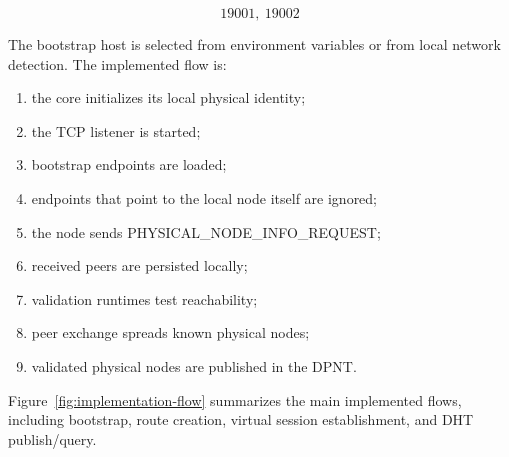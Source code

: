 \documentclass[12pt,a4paper]{article}
\newcommand{\codebreak}[1]{{\footnotesize\ttfamily #1}}
\begin{document}
\begin{equation}
    19001,\ 19002
\end{equation}

The bootstrap host is selected from environment variables or from local network detection. The implemented flow is:

\begin{enumerate}
    \item the core initializes its local physical identity;
    \item the TCP listener is started;
    \item bootstrap endpoints are loaded;
    \item endpoints that point to the local node itself are ignored;
    \item the node sends \codebreak{PHYSICAL\_\allowbreak{}NODE\_\allowbreak{}INFO\_\allowbreak{}REQUEST};
    \item received peers are persisted locally;
    \item validation runtimes test reachability;
    \item peer exchange spreads known physical nodes;
    \item validated physical nodes are published in the DPNT.
\end{enumerate}

Figure~\ref{fig:implementation-flow} summarizes the main implemented flows, including bootstrap, route creation, virtual session establishment, and DHT publish/query.
\end{document}
